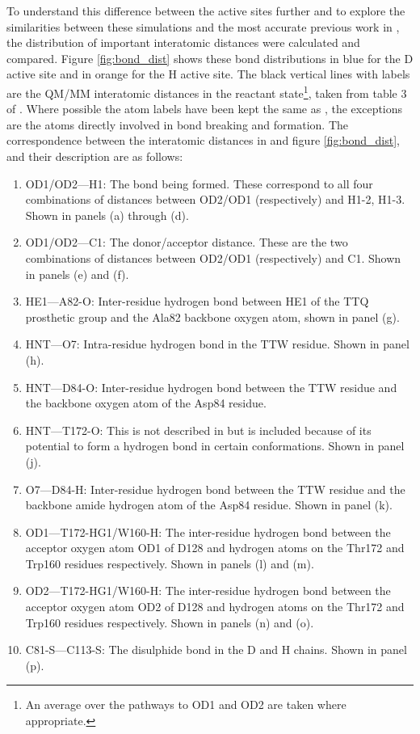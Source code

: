 To understand this difference between the active sites further and to explore the similarities between these simulations and the most accurate previous work in \cite{ranaghanInitioQMMM2017}, the distribution of important interatomic distances were calculated and compared. Figure \ref{fig:bond_dist} shows these bond distributions in blue for the D active site and in orange for the H active site. The black vertical lines with labels are the QM/MM interatomic distances in the reactant state\footnote{An average over the pathways to OD1 and OD2 are taken where appropriate.}, taken from table 3 of \cite{ranaghanInitioQMMM2017}. Where possible  the atom labels have been kept the same as \cite{ranaghanInitioQMMM2017}, the exceptions are the atoms directly involved in bond breaking and formation. The correspondence between the interatomic distances in \cite{ranaghanInitioQMMM2017} and figure \ref{fig:bond_dist}, and their description are as follows: 
\begin{enumerate}
    \item OD1/OD2---H1:  The bond being formed. These correspond to all four combinations of distances between OD2/OD1 (respectively) and H1-2, H1-3. Shown in panels (a) through (d). 
    \item OD1/OD2---C1: The donor/acceptor distance. These are the two combinations of distances between OD2/OD1 (respectively) and C1. Shown in panels (e) and (f). 
    \item HE1---A82-O: Inter-residue hydrogen bond between HE1 of the TTQ prosthetic group and the Ala82 backbone oxygen atom, shown in panel (g). 
    \item HNT---O7: Intra-residue hydrogen bond in the TTW residue. Shown in panel (h). 
    \item HNT---D84-O: Inter-residue hydrogen bond between the TTW residue and the backbone oxygen atom of the Asp84 residue. 
    \item HNT---T172-O: This is not described in \cite{ranaghanInitioQMMM2017} but is included because of its potential to form a hydrogen bond in certain conformations. Shown in panel (j). 
    \item O7---D84-H: Inter-residue hydrogen bond between the TTW residue and the backbone amide hydrogen atom of the Asp84 residue. Shown in panel (k). 
    \item OD1---T172-HG1/W160-H: The inter-residue hydrogen bond between the acceptor oxygen atom OD1 of D128 and hydrogen atoms on the Thr172 and Trp160 residues respectively. Shown in panels (l) and (m).
    \item OD2---T172-HG1/W160-H: The inter-residue hydrogen bond between the acceptor oxygen atom OD2 of D128 and hydrogen atoms on the Thr172 and Trp160 residues respectively. Shown in panels (n) and (o).\label{o1_t172}
    \item C81-S---C113-S: The disulphide bond in the D and H chains. Shown in panel (p). \label{cs_cs} 
\end{enumerate}

